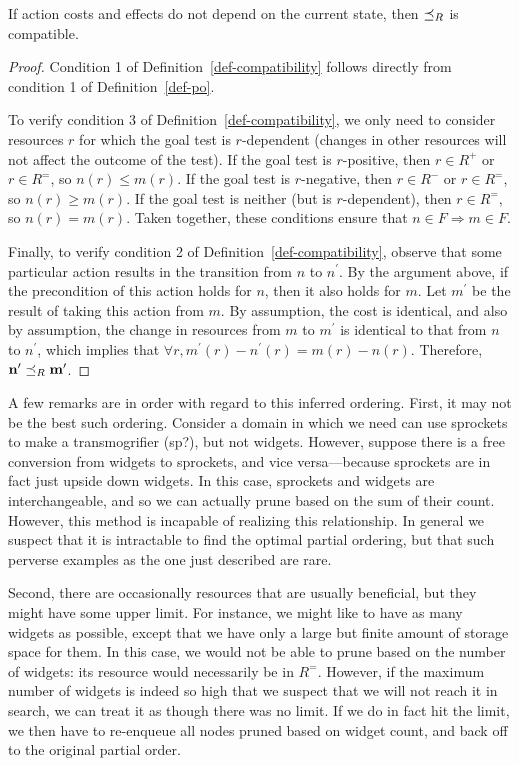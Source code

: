 \documentclass[letterpaper]{article}
\theoremstyle{plain} \newtheorem{theorem}{Theorem} \newtheorem{proposition}{Proposition} \newtheorem{lemma}{Lemma}
\theoremstyle{definition} \newtheorem{definition}{Definition} \newtheorem{conjecture}{Conjecture} \newtheorem*{example}{Example}
\theoremstyle{remark} \newtheorem*{remark}{Remark} \newtheorem*{note}{Note} \newtheorem{case}{Case}
\begin{document}
\begin{claim}{}{\label{clm-po-compatible}}
	If action costs and effects do not depend on the current state, then $\preceq_R$ is compatible.
\end{claim}
\begin{proof}
	Condition 1 of Definition~\ref{def-compatibility} follows directly from condition 1 of Definition~\ref{def-po}.
	
	To verify condition 3 of Definition~\ref{def-compatibility}, we only need to consider resources $r$ for which the goal test is $r$-dependent (changes in other resources will not affect the outcome of the test). If the goal test is $r$-positive, then $r \in R^+$ or $r \in R^=$, so $n(r) \le m(r)$. If the goal test is $r$-negative, then $r \in R^-$ or $r \in R^=$, so $n(r) \ge m(r)$. If the goal test is neither (but is $r$-dependent), then $r \in R^=$, so $n(r) = m(r)$. Taken together, these conditions ensure that $n \in F \Rightarrow m \in F$.
	
	Finally, to verify condition 2 of Definition~\ref{def-compatibility}, observe that some particular action results in the transition from $n$ to $n^\prime$. By the argument above, if the precondition of this action holds for $n$, then it also holds for $m$. Let
  $m^\prime$ be the result of taking this action from $m$. By assumption, the cost is identical, and also by assumption, the change in resources from $m$ to $m^\prime$ is identical to that from $n$ to $n^\prime$, which implies that $\forall r, m^\prime(r) -
  n^\prime(r) = m(r) - n(r)$. Therefore, $\mathbf{n^\prime} \preceq_R \mathbf{m^\prime}$.
\end{proof}

A few remarks are in order with regard to this inferred ordering.
First, it may not be the best such ordering. Consider a domain in
which we need can use sprockets to make a transmogrifier (sp?), but
not widgets. However, suppose there is a free conversion from widgets
to sprockets, and vice versa---because sprockets are in fact just
upside down widgets. In this case, sprockets and widgets are
interchangeable, and so we can actually prune based on the sum of
their count. However, this method is incapable of realizing this
relationship. In general we suspect that it is intractable to find the
optimal partial ordering, but that such perverse examples
as the one just described are rare.

Second, there are occasionally resources that are usually beneficial,
but they might have some upper limit. For instance, we might like
to have as many widgets as possible, except that we have only a
large but finite amount of storage space for them.  In this case,
we would not be able to prune based on the number of widgets: its
resource would necessarily be in $R^=$. However, if the maximum
number of widgets is indeed so high that we suspect that we will
not reach it in search, we can treat it as though there was no
limit. If we do in fact hit the limit, we then have to re-enqueue
all nodes pruned based on widget count, and back off to the original
partial order.
\end{document}

